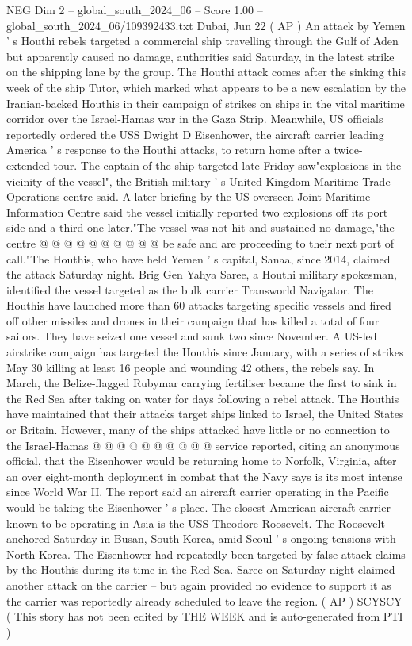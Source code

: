 \begin{textsample}{NEG Dim 2 – global\_south\_2024\_06 – Score 1.00 – global\_south\_2024\_06/109392433.txt}  \label{ex:f2_neg_391}
Dubai, Jun 22 ( AP ) An attack by Yemen ' s Houthi rebels targeted a commercial ship travelling through the Gulf of Aden but apparently caused no damage, authorities said Saturday, in the latest strike on the shipping lane by the group.
The Houthi attack comes after the sinking this week of the ship Tutor, which marked what appears to be a new escalation by the Iranian-backed Houthis in their campaign of strikes on ships in the vital maritime corridor over the Israel-Hamas war in the Gaza Strip.
Meanwhile, US officials reportedly ordered the USS Dwight D Eisenhower, the aircraft carrier leading America ' s response to the Houthi attacks, to return home after a twice-extended tour.
The captain of the ship targeted late Friday saw"explosions in the vicinity of the vessel", the British military ' s United Kingdom Maritime Trade Operations centre said.
A later briefing by the US-overseen Joint Maritime Information Centre said the vessel initially reported two explosions off its port side and a third one later."The vessel was not hit and sustained no damage,"the centre @ @ @ @ @ @ @ @ @ @ be safe and are proceeding to their next port of call."The Houthis, who have held Yemen ' s capital, Sanaa, since 2014, claimed the attack Saturday night.
Brig Gen Yahya Saree, a Houthi military spokesman, identified the vessel targeted as the bulk carrier Transworld Navigator.
The Houthis have launched more than 60 attacks targeting specific vessels and fired off other missiles and drones in their campaign that has killed a total of four sailors.
They have seized one vessel and sunk two since November.
A US-led airstrike campaign has targeted the Houthis since January, with a series of strikes May 30 killing at least 16 people and wounding 42 others, the rebels say.
In March, the Belize-flagged Rubymar carrying fertiliser became the first to sink in the Red Sea after taking on water for days following a rebel attack.
The Houthis have maintained that their attacks target ships linked to Israel, the United States or Britain.
However, many of the ships attacked have little or no connection to the Israel-Hamas @ @ @ @ @ @ @ @ @ @ service reported, citing an anonymous official, that the Eisenhower would be returning home to Norfolk, Virginia, after an over eight-month deployment in combat that the Navy says is its most intense since World War II.
The report said an aircraft carrier operating in the Pacific would be taking the Eisenhower ' s place.
The closest American aircraft carrier known to be operating in Asia is the USS Theodore Roosevelt.
The Roosevelt anchored Saturday in Busan, South Korea, amid Seoul ' s ongoing tensions with North Korea.
The Eisenhower had repeatedly been targeted by false attack claims by the Houthis during its time in the Red Sea.
Saree on Saturday night claimed another attack on the carrier -- but again provided no evidence to support it as the carrier was reportedly already scheduled to leave the region. ( AP ) SCYSCY ( This story has not been edited by THE WEEK and is auto-generated from PTI )

\end{textsample}
